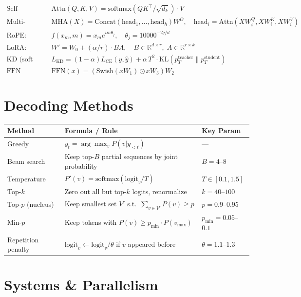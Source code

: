 \begin{align}
\text{Self-Attention:}&\quad \text{Attn}(Q,K,V) = \text{softmax}(QK^\top / \sqrt{d_k}) \cdot V \\
\text{Multi-Head:}&\quad \text{MHA}(X) = \text{Concat}(\text{head}_1, \ldots, \text{head}_h)W^O,\quad \text{head}_i = \text{Attn}(XW_i^Q, XW_i^K, XW_i^V) \\
\text{RoPE:}&\quad f(x_m, m) = x_m e^{im\theta_j}, \quad \theta_j = 10000^{-2j/d} \\
\text{LoRA:}&\quad W' = W_0 + (\alpha/r) \cdot BA, \quad B \in \mathbb{R}^{d \times r},\; A \in \mathbb{R}^{r \times k} \\
\text{KD (soft targets):}&\quad L_\text{KD} = (1{-}\alpha)L_\text{CE}(y, \hat{y}) + \alpha\, T^2 \cdot \text{KL}(p_T^\text{teacher} \| p_T^\text{student}) \\
\text{FFN (SwiGLU):}&\quad \text{FFN}(x) = (\text{Swish}(xW_1) \odot xW_3) W_2
\end{align}

\section{Decoding Methods}
\label{decoding-methods}

\begin{tabular}{@{}lp{5cm}p{8cm}@{}}
\toprule
\textbf{Method} & \textbf{Formula / Rule} & \textbf{Key Param} \\
\midrule
Greedy & $y_t = \arg\max_v P(v|y_{<t})$ & --- \\
Beam search & Keep top-$B$ partial sequences by joint probability & $B=4$--$8$ \\
Temperature & $P'(v) = \text{softmax}(\text{logit}_v / T)$ & $T \in [0.1, 1.5]$ \\
Top-$k$ & Zero out all but top-$k$ logits, renormalize & $k=40$--$100$ \\
Top-$p$ (nucleus) & Keep smallest set $V'$ s.t.~$\sum_{v \in V'} P(v) \geq p$ & $p=0.9$--$0.95$ \\
Min-$p$ & Keep tokens with $P(v) \geq p_\text{min} \cdot P(v_\text{max})$ & $p_\text{min}=0.05$--$0.1$ \\
Repetition penalty & $\text{logit}_v \leftarrow \text{logit}_v / \theta$ if $v$ appeared before & $\theta=1.1$--$1.3$ \\
\bottomrule
\end{tabular}

\section{Systems \& Parallelism}
\label{systems-parallelism}


